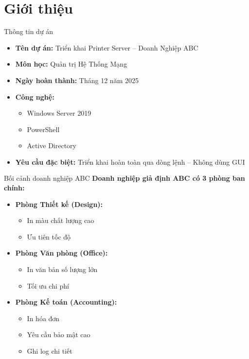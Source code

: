 \documentclass{beamer}
\begin{document}
    \section{Giới thiệu}
    \begin{frame}{Thông tin dự án}
        \begin{itemize}
            \item \textbf{Tên dự án:} Triển khai Printer Server – Doanh Nghiệp ABC
            \item \textbf{Môn học:} Quản trị Hệ Thống Mạng
            \item \textbf{Ngày hoàn thành:} Tháng 12 năm 2025
            \item \textbf{Công nghệ:} 
                \begin{itemize}
                    \item Windows Server 2019
                    \item PowerShell
                    \item Active Directory
                \end{itemize}
            \item \textbf{Yêu cầu đặc biệt:} Triển khai hoàn toàn qua dòng lệnh – Không dùng GUI
        \end{itemize}
    \end{frame}
    
    \begin{frame}{Bối cảnh doanh nghiệp ABC}
        \textbf{Doanh nghiệp giả định ABC có 3 phòng ban chính:}
        \begin{itemize}
            \item \textbf{Phòng Thiết kế (Design):}
                \begin{itemize}
                    \item In màu chất lượng cao
                    \item Ưu tiên tốc độ
                \end{itemize}
            \item \textbf{Phòng Văn phòng (Office):}
                \begin{itemize}
                    \item In văn bản số lượng lớn
                    \item Tối ưu chi phí
                \end{itemize}
            \item \textbf{Phòng Kế toán (Accounting):}
                \begin{itemize}
                    \item In hóa đơn
                    \item Yêu cầu bảo mật cao
                    \item Ghi log chi tiết
                \end{itemize}
        \end{itemize}
    \end{frame}
    
\end{document}
